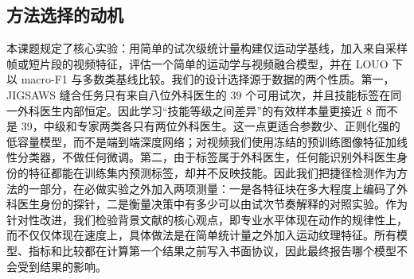\subsection{方法选择的动机}

本课题规定了核心实验：用简单的试次级统计量构建仅运动学基线，加入来自采样帧或短片段的视频特征，评估一个简单的运动学与视频融合模型，并在 LOUO 下以 macro-F1 与多数类基线比较。我们的设计选择源于数据的两个性质。第一，JIGSAWS 缝合任务只有来自八位外科医生的 39 个可用试次，并且技能标签在同一外科医生内部恒定。因此学习“技能等级之间差异”的有效样本量更接近 8 而不是 39，中级和专家两类各只有两位外科医生。这一点更适合参数少、正则化强的低容量模型，而不是端到端深度网络；对视频我们使用冻结的预训练图像特征加线性分类器，不做任何微调。第二，由于标签属于外科医生，任何能识别外科医生身份的特征都能在训练集内预测标签，却并不反映技能。因此我们把捷径检测作为方法的一部分，在必做实验之外加入两项测量：一是各特征块在多大程度上编码了外科医生身份的探针，二是衡量决策中有多少可以由试次节奏解释的对照实验。作为针对性改进，我们检验背景文献的核心观点，即专业水平体现在动作的规律性上，而不仅仅体现在速度上，具体做法是在简单统计量之外加入运动纹理特征。所有模型、指标和比较都在计算第一个结果之前写入书面协议，因此最终报告哪个模型不会受到结果的影响。
